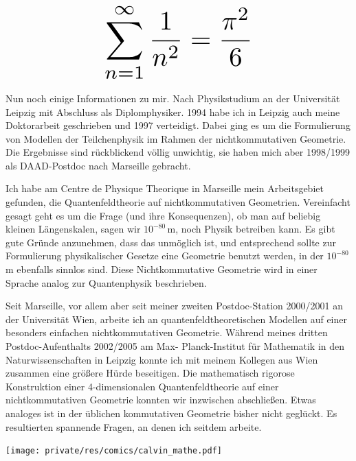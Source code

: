 \begin{multicols}{2}
\[
\resizebox{0.45\hsize}{!}{$\displaystyle\sum_{n = 1}^\infty \frac{1}{n^2} = \frac{\pi^2}{6}$}
\]

Nun noch einige Informationen zu mir. Nach Physikstudium an der Universität Leipzig mit Abschluss als Diplomphysiker. 1994 habe ich in Leipzig auch meine Doktorarbeit geschrieben und 1997 verteidigt. Dabei ging es um die Formulierung von Modellen der Teilchenphysik im Rahmen der nichtkommutativen Geometrie. Die Ergebnisse sind rückblickend völlig unwichtig, sie haben mich aber 1998/1999 als DAAD-Postdoc nach Marseille gebracht.

Ich habe am Centre de Physique Theorique in Marseille mein Arbeitsgebiet gefunden, die Quantenfeldtheorie auf nichtkommutativen Geometrien. Vereinfacht gesagt geht es um die Frage (und ihre Konsequenzen), ob man auf beliebig kleinen Längenskalen, sagen wir $10^{-80}$\,m, noch Physik betreiben kann. Es gibt gute Gründe anzunehmen, dass das unmöglich ist, und entsprechend sollte zur Formulierung physikalischer Gesetze eine Geometrie benutzt werden, in der $10^{-80}$\,m ebenfalls sinnlos sind. Diese Nichtkommutative Geometrie wird in einer Sprache analog zur Quantenphysik beschrieben.

Seit Marseille, vor allem aber seit meiner zweiten Postdoc-Station 2000/2001 an der Universität Wien, arbeite ich an quantenfeldtheoretischen Modellen auf einer besonders einfachen nichtkommutativen Geometrie. Während meines dritten Postdoc-Aufenthalts 2002/2005 am Max- Planck-Institut für Mathematik in den Naturwissenschaften in Leipzig konnte ich mit meinem Kollegen aus Wien zusammen eine größere Hürde beseitigen. Die mathematisch rigorose Konstruktion einer 4-dimensionalen Quantenfeldtheorie auf einer nichtkommutativen Geometrie konnten wir inzwischen abschließen. Etwas analoges ist in der üblichen kommutativen Geometrie bisher nicht geglückt. Es resultierten spannende Fragen, an denen ich seitdem arbeite.

\begin{center}
 	\texttt{[image: private/res/comics/calvin\_mathe.pdf]}
\end{center}

\end{multicols}
